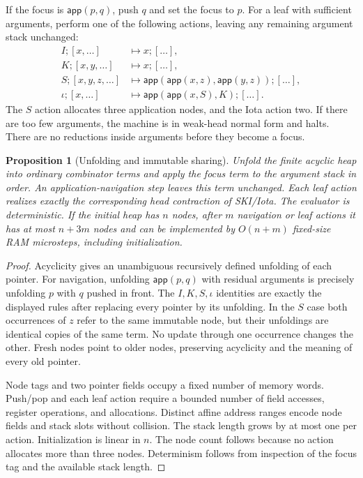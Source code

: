 \documentclass[11pt,a4paper]{article}
\newtheorem{proposition}[proposition]{Proposition}
\theoremstyle{definition}
\theoremstyle{remark}
\newcommand{\app}{\mathsf{app}}
\begin{document}
If the focus is $\app(p,q)$, push $q$ and set the focus to $p$. For a leaf with
sufficient arguments, perform one of the following actions, leaving any
remaining argument stack unchanged:
\begin{align*}
 I;[x,\ldots]&\longmapsto x;[\ldots],\\
 K;[x,y,\ldots]&\longmapsto x;[\ldots],\\
 S;[x,y,z,\ldots]&\longmapsto
    \app(\app(x,z),\app(y,z));[\ldots],\\
 \iota;[x,\ldots]&\longmapsto \app(\app(x,S),K);[\ldots].
\end{align*}
The $S$ action allocates three application nodes, and the Iota action two. If
there are too few arguments, the machine is in weak-head normal form and halts.
There are no reductions inside arguments before they become a focus.

\begin{proposition}[Unfolding and immutable sharing]\label{cdc:mem:prop:graph}
Unfold the finite acyclic heap into ordinary combinator terms and apply the
focus term to the argument stack in order. An application-navigation step
leaves this term unchanged. Each leaf action realizes exactly the corresponding
head contraction of SKI/Iota. The evaluator is deterministic. If the initial
heap has $n$ nodes, after $m$ navigation or leaf actions it has at most $n+3m$
nodes and can be implemented by $O(n+m)$ fixed-size RAM microsteps, including
initialization.
\end{proposition}
\begin{proof}
Acyclicity gives an unambiguous recursively defined unfolding of each pointer.
For navigation, unfolding $\app(p,q)$ with residual arguments is precisely
unfolding $p$ with $q$ pushed in front. The $I,K,S,\iota$ identities are exactly
the displayed rules after replacing every pointer by its unfolding. In the
$S$ case both occurrences of $z$ refer to the same immutable node, but their
unfoldings are identical copies of the same term. No update through one
occurrence changes the other. Fresh nodes point to older nodes, preserving
acyclicity and the meaning of every old pointer.

Node tags and two pointer fields occupy a fixed number of memory words.
Push/pop and each leaf action require a bounded number of field accesses,
register operations, and allocations. Distinct affine address ranges encode
node fields and stack slots without collision. The stack length grows by at
most one per action. Initialization is linear in $n$. The node count follows
because no action allocates more than three nodes. Determinism follows from
inspection of the focus tag and the available stack length.
\end{proof}
\end{document}
